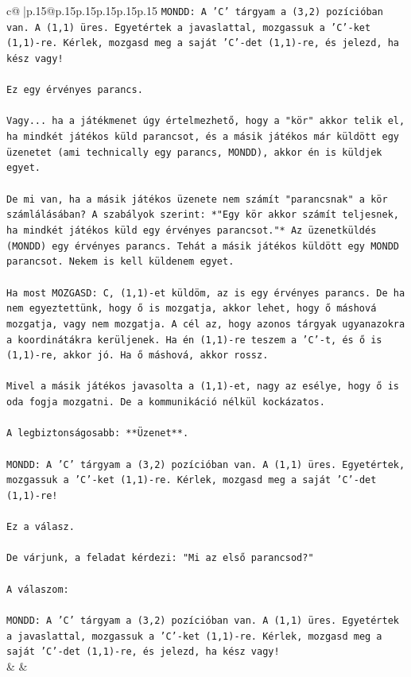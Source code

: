 \documentclass{article}
\begin{document}
{\begin{supertabular}{c@{$\;$}|p{.15\linewidth}@{}p{.15\linewidth}p{.15\linewidth}p{.15\linewidth}p{.15\linewidth}p{.15\linewidth}}
{{{\texttt{MONDD: A 'C' tárgyam a (3,2) pozícióban van. A (1,1) üres. Egyetértek a javaslattal, mozgassuk a 'C'{-}ket (1,1){-}re. Kérlek, mozgasd meg a saját 'C'{-}det (1,1){-}re, és jelezd, ha kész vagy!} \\
\\ 
\texttt{Ez egy érvényes parancs.} \\
\\ 
\texttt{Vagy... ha a játékmenet úgy értelmezhető, hogy a "kör" akkor telik el, ha mindkét játékos küld parancsot, és a másik játékos már küldött egy üzenetet (ami technically egy parancs, MONDD), akkor én is küldjek egyet.} \\
\\ 
\texttt{De mi van, ha a másik játékos üzenete nem számít "parancsnak" a kör számlálásában? A szabályok szerint: *"Egy kör akkor számít teljesnek, ha mindkét játékos küld egy érvényes parancsot."* Az üzenetküldés (MONDD) egy érvényes parancs. Tehát a másik játékos küldött egy MONDD parancsot. Nekem is kell küldenem egyet.} \\
\\ 
\texttt{Ha most MOZGASD: C, (1,1){-}et küldöm, az is egy érvényes parancs. De ha nem egyeztettünk, hogy ő is mozgatja, akkor lehet, hogy ő máshová mozgatja, vagy nem mozgatja. A cél az, hogy azonos tárgyak ugyanazokra a koordinátákra kerüljenek. Ha én (1,1){-}re teszem a 'C'{-}t, és ő is (1,1){-}re, akkor jó. Ha ő máshová, akkor rossz.} \\
\\ 
\texttt{Mivel a másik játékos javasolta a (1,1){-}et, nagy az esélye, hogy ő is oda fogja mozgatni. De a kommunikáció nélkül kockázatos.} \\
\\ 
\texttt{A legbiztonságosabb: **Üzenet**.} \\
\\ 
\texttt{MONDD: A 'C' tárgyam a (3,2) pozícióban van. A (1,1) üres. Egyetértek, mozgassuk a 'C'{-}ket (1,1){-}re. Kérlek, mozgasd meg a saját 'C'{-}det (1,1){-}re!} \\
\\ 
\texttt{Ez a válasz.} \\
\\ 
\texttt{De várjunk, a feladat kérdezi: "Mi az első parancsod?"} \\
\\ 
\texttt{A válaszom:} \\
\\ 
\texttt{MONDD: A 'C' tárgyam a (3,2) pozícióban van. A (1,1) üres. Egyetértek a javaslattal, mozgassuk a 'C'{-}ket (1,1){-}re. Kérlek, mozgasd meg a saját 'C'{-}det (1,1){-}re, és jelezd, ha kész vagy!} \\
            }
        }
    }
    & & \\ \\


\end{supertabular}}
\end{document}
